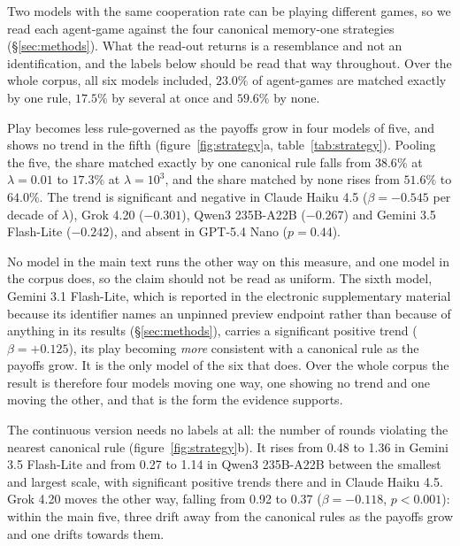\documentclass[11pt,a4paper]{article}
\newcommand{\lam}{\lambda}
\begin{document}
Two models with the same cooperation rate can be
playing different games, so we read each agent-game against the four canonical
memory-one strategies (\S\ref{sec:methods}). What the read-out returns is a
resemblance and not an identification, and the labels below should be read that
way throughout. Over the whole corpus, all six models included, $23.0\%$ of
agent-games are matched
exactly by one rule, $17.5\%$ by several at once and $59.6\%$ by none.

Play becomes less rule-governed as the payoffs grow in four models of five, and
shows no trend in the fifth (figure~\ref{fig:strategy}a,
table~\ref{tab:strategy}). Pooling the five, the share matched exactly by one
canonical rule falls from $38.6\%$ at $\lam = 0.01$ to $17.3\%$ at
$\lam = 10^{3}$, and the share matched by none rises from $51.6\%$ to $64.0\%$.
The trend is significant and negative in Claude Haiku 4.5 ($\beta = -0.545$ per
decade of $\lam$), Grok 4.20 ($-0.301$), Qwen3 235B-A22B ($-0.267$) and Gemini
3.5 Flash-Lite ($-0.242$), and absent in GPT-5.4 Nano ($p = 0.44$).

No model in the main text runs the other way on this measure, and one model in
the corpus does, so the claim should not be read as uniform. The sixth model,
Gemini 3.1 Flash-Lite, which is reported in the electronic supplementary
material because its identifier names an unpinned preview endpoint rather than
because of anything in its results (\S\ref{sec:methods}), carries a significant
positive trend ($\beta = +0.125$), its play becoming \emph{more} consistent with
a canonical rule as the payoffs grow. It is the only model of the six that does.
Over the whole corpus the result is therefore four models moving one way, one
showing no trend and one moving the other, and that is the form the evidence
supports.

The continuous version needs no labels at all: the number of rounds violating
the nearest canonical rule (figure~\ref{fig:strategy}b). It rises from 0.48 to
1.36 in Gemini 3.5 Flash-Lite and from 0.27 to 1.14 in Qwen3 235B-A22B between
the smallest and largest scale, with significant positive trends there and in
Claude Haiku 4.5. Grok 4.20 moves the other way, falling from 0.92 to 0.37
($\beta = -0.118$, $p < 0.001$): within the main five, three drift away from the
canonical rules as the payoffs grow and one drifts towards them.
\end{document}
